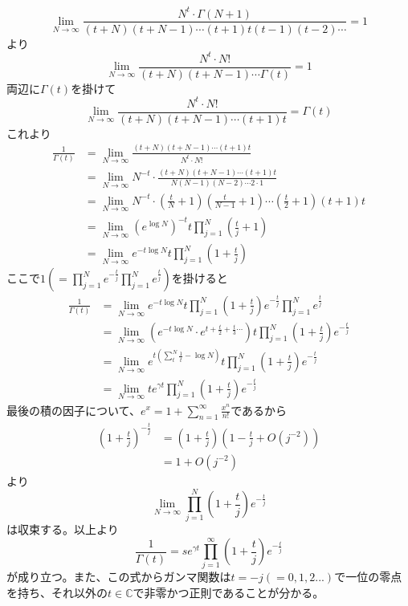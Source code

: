 \documentclass{jsarticle}
\begin{document}
\[
\lim_{N\to\infty}\frac{N^{t}\cdot\Gamma(N+1)}{(t+N)(t+N-1)\cdots(t+1)t(t-1)(t-2)\cdots}
=1
\]
より
\[
\lim_{N\to\infty}\frac{N^{t}\cdot N!}{(t+N)(t+N-1)\cdots\Gamma(t)}=1
\]
両辺に\(\Gamma(t)\)を掛けて
\[\lim_{N\to\infty}\frac{N^{t}\cdot N!}{(t+N)(t+N-1)\cdots(t+1)t}=\Gamma(t)\]
これより
\begin{align*}
\frac{1}{\Gamma(t)}&=\lim_{N\to\infty}\frac{(t+N)(t+N-1)\cdots(t+1)t}{N^t\cdot N!}\\
&=\lim_{N\to\infty}N^{-t}\cdot\frac{(t+N)(t+N-1)\cdots(t+1)t}{N(N-1)(N-2)\cdots2\cdot1}\\
&=\lim_{N\to\infty}N^{-t}\cdot\left(\frac{t}{N}+1\right)\left(\frac{t}{N-1}+1\right)\cdots\left(\frac{t}{2}+1\right)\left(t+1\right)t\\
&=\lim_{N\to\infty}\left(e^{\log N}\right)^{-t}t\prod_{j=1}^{N}\left(\frac{t}{j}+1\right)\\
&=\lim_{N\to\infty}e^{-t\log N}t\prod_{j=1}^{N}\left(1+\frac{t}{j}\right)
\end{align*}
ここで\(\displaystyle1\left(=\prod_{j=1}^{N}e^{-\frac{t}{j}}\prod_{j=1}^{N}e^{\frac{t}{j}}\right)\)を掛けると
\begin{align*}
\frac{1}{\Gamma(t)}&=\lim_{N\to\infty}e^{-t\log N}t\prod_{j=1}^{N}\left(1+\frac{t}{j}\right)e^{-\frac{t}{j}}\prod_{j=1}^{N}e^{\frac{t}{j}}\\
&=\lim_{N\to\infty}\left(e^{-t\log N}\cdot e^{t+\frac{t}{2}+\frac{t}{3}\cdots}\right)t\prod_{j=1}^{N}\left(1+\frac{t}{j}\right)e^{-\frac{t}{j}}\\
&=\lim_{N\to\infty}e^{t\left(\sum_{t}^{N}\frac{1}{t}-\log N\right)}t\prod_{j=1}^{N}\left(1+\frac{t}{j}\right)e^{-\frac{t}{j}}\\
&=\lim_{N\to\infty}te^{\gamma t}\prod_{j=1}^{N}\left(1+\frac{t}{j}\right)e^{-\frac{t}{j}}
\end{align*}
最後の積の因子について、\(\displaystyle e^{x}=1+\sum_{n=1}^{\infty}\frac{x^{n}}{n!}\)であるから
\begin{align*}
\left(1+\frac{t}{j}\right)^{-\frac{t}{j}}&=\left(1+\frac{t}{j}\right)\left(1-\frac{t}{j}+O(j^{-2})\right)\\
&=1+O(j^{-2})
\end{align*}
より
\[\lim_{N\to\infty}\prod_{j=1}^{N}\left(1+\frac{t}{j}\right)e^{-\frac{t}{j}}\]
は収束する。以上より
\[
\frac{1}{\Gamma(t)}=se^{\gamma t}\prod_{j=1}^{\infty}\left(1+\frac{t}{j}\right)e^{-\frac{t}{j}}
\]
が成り立つ。また、この式からガンマ関数は\(t=-j(=0,1,2...)\)で一位の零点を持ち、それ以外の\(t\in\mathbb{C}\)で非零かつ正則であることが分かる。\\
\end{document}
